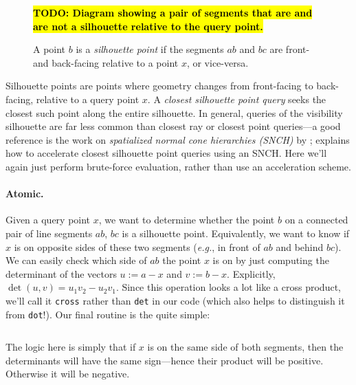 \documentclass{article}
\newcommand{\code}[1]{\texttt{#1}}
\newcommand{\todo}[1]{\textbf{\hl{TODO: #1}}}
\newcommand{\eg}{\emph{e.g.}} %
\renewcommand{\vec}[1]{#1}
\begin{document}
\begin{figure}[h!]
   \todo{Diagram showing a pair of segments that are and are not a silhouette relative to the query point.}
   \caption{A point \(\vec{b}\) is a \emph{silhouette point} if the segments \(\vec{a}\vec{b}\) and \(\vec{b}\vec{c}\) are front- and back-facing relative to a point \(\vec{x}\), or vice-versa.}
\end{figure}

Silhouette points are points where geometry changes from front-facing to back-facing, relative to a query point \(\vec{x}\).  A \emph{closest silhouette point query} seeks the closest such point along the entire silhouette.  In general, queries of the visibility silhouette are far less common than closest ray or closest point queries---a good reference is the work on \emph{spatialized normal cone hierarchies (SNCH)} by \citet{johnson2001spatialized}; \citet[Section 5.1]{Sawhney:2023:WoSt} explains how to accelerate closest silhouette point queries using an SNCH.  Here we'll again just perform brute-force evaluation, rather than use an acceleration scheme.

\paragraph{Atomic.} Given a query point \(\vec{x}\), we want to determine whether the point \(\vec{b}\) on a connected pair of line segments \(\vec{a}\vec{b}\), \(\vec{b}\vec{c}\) is a silhouette point.  Equivalently, we want to know if \(\vec{x}\) is on opposite sides of these two segments (\eg{}, in front of \(\vec{a}\vec{b}\) and behind \(\vec{b}\vec{c}\)).  We can easily check which side of \(\vec{a}\vec{b}\) the point \(\vec{x}\) is on by just computing the determinant of the vectors \(\vec{u} := \vec{a}-\vec{x}\) and \(\vec{v} := \vec{b}-\vec{x}\).  Explicitly, \(\det(\vec{u},\vec{v}) = \vec{u}_1 \vec{v}_2 - \vec{u}_2 \vec{v}_1\).  Since this operation looks a lot like a cross product, we'll call it \code{cross} rather than \code{det} in our code (which also helps to distinguish it from \code{dot}!).  Our final routine is the quite simple:

\inputminted[fontsize=\small,linenos,firstline=43,lastline=46,bgcolor=bg]{cpp}{../code/WoStLaplace2D.cpp}

The logic here is simply that if \(\vec{x}\) is on the same side of both segments, then the determinants will have the same sign---hence their product will be positive.  Otherwise it will be negative.
\end{document}
